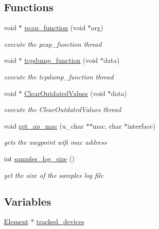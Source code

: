 \subsection*{Functions}
\begin{DoxyCompactItemize}
\item 
void $\ast$ \hyperlink{pcap-thread_8h_aa6cca3d417df0d64edcfbfaa2f445aab}{pcap\+\_\+function} (void $\ast$arg)
\begin{DoxyCompactList}\small\item\em execute the pcap\+\_\+function thread \end{DoxyCompactList}\item 
void $\ast$ \hyperlink{pcap-thread_8h_a80533e12c13720352712455e86eac14d}{tcpdump\+\_\+function} (void $\ast$data)
\begin{DoxyCompactList}\small\item\em execute the tcpdump\+\_\+function thread \end{DoxyCompactList}\item 
void $\ast$ \hyperlink{pcap-thread_8h_aa7fbc627d49703073084fc66e79ef7c0}{Clear\+Outdated\+Values} (void $\ast$data)
\begin{DoxyCompactList}\small\item\em execute the Clear\+Outdated\+Values thread \end{DoxyCompactList}\item 
void \hyperlink{pcap-thread_8h_af7e8fb860db3c87ed3bec362216a5c7c}{get\+\_\+ap\+\_\+mac} (u\+\_\+char $\ast$$\ast$mac, char $\ast$interface)
\begin{DoxyCompactList}\small\item\em gets the waypoint wifi mac address \end{DoxyCompactList}\item 
int \hyperlink{pcap-thread_8h_a70cd3fb82216b3537d8691fcbd6dee10}{samples\+\_\+log\+\_\+size} ()
\begin{DoxyCompactList}\small\item\em get the size of the samples log file \end{DoxyCompactList}\end{DoxyCompactItemize}
\subsection*{Variables}
\begin{DoxyCompactItemize}
\item 
\hyperlink{struct_element}{Element} $\ast$ \hyperlink{pcap-thread_8h_ae9a40f931aeffc206a0d29a3f8be1141}{tracked\+\_\+devices}
\end{DoxyCompactItemize}


